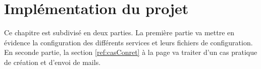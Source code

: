 \documentclass[a4paper,12pt,french]{report} %
\begin{document}

\chapter{Implémentation du projet}
Ce chapitre est subdivisé en deux parties. La première partie va mettre en évidence la configuration des différents services et leurs fichiers de configuration. En seconde partie, la section \ref{ref:casConret} à la page \pageref{ref:casConret} va traiter d'un cas pratique de création et d'envoi de mails. 
\end{document}
